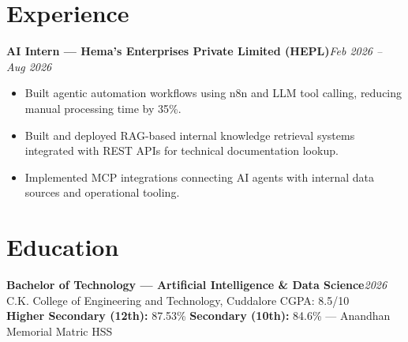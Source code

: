 \documentclass[a4paper,10pt]{article}
\begin{document}
\section{Experience}

\vspace{1.5pt}
\textbf{AI Intern --- Hema's Enterprises Private Limited (HEPL)}\hfill\textit{Feb 2026 -- Aug 2026}

\begin{itemize}
  \item Built agentic automation workflows using n8n and LLM tool calling, reducing manual processing time by 35\%.
  \item Built and deployed RAG-based internal knowledge retrieval systems integrated with REST APIs for technical documentation lookup.
  \item Implemented MCP integrations connecting AI agents with internal data sources and operational tooling.
\end{itemize}

\section{Education}

\vspace{1.5pt}
\textbf{Bachelor of Technology --- Artificial Intelligence \& Data Science}\hfill\textit{2026}\\
C.K. College of Engineering and Technology, Cuddalore \hfill CGPA: 8.5/10\\[1.5pt]
\textbf{Higher Secondary (12th):} 87.53\% \enspace\textbar\enspace \textbf{Secondary (10th):} 84.6\% --- Anandhan Memorial Matric HSS
\end{document}
